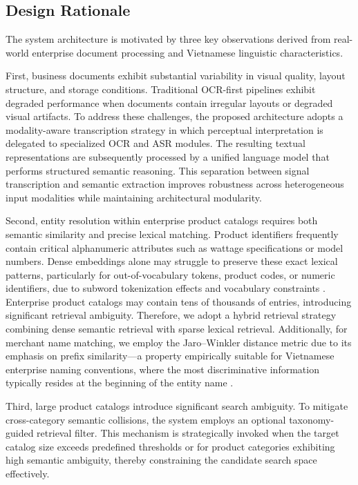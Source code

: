 \subsection{Design Rationale}
The system architecture is motivated by three key observations derived from real-world enterprise document processing and Vietnamese linguistic characteristics.

First, business documents exhibit substantial variability in visual quality, layout structure, and storage conditions. Traditional OCR-first pipelines exhibit degraded performance when documents contain irregular layouts or degraded visual artifacts. To address these challenges, the proposed architecture adopts a modality-aware transcription strategy in which perceptual interpretation is delegated to specialized OCR and ASR modules. The resulting textual representations are subsequently processed by a unified language model that performs structured semantic reasoning. This separation between signal transcription and semantic extraction improves robustness across heterogeneous input modalities while maintaining architectural modularity.

Second, entity resolution within enterprise product catalogs requires both semantic similarity and precise lexical matching. Product identifiers frequently contain critical alphanumeric attributes such as wattage specifications or model numbers. Dense embeddings alone may struggle to preserve these exact lexical patterns, particularly for out-of-vocabulary tokens, product codes, or numeric identifiers, due to subword tokenization effects and vocabulary constraints \parencite{thakur2021beir, lin2022pretrained}. Enterprise product catalogs may contain tens of thousands of entries, introducing significant retrieval ambiguity.
Therefore, we adopt a hybrid retrieval strategy combining dense semantic retrieval with sparse lexical retrieval. Additionally, for merchant name matching, we employ the Jaro–Winkler distance metric due to its emphasis on prefix similarity---a property empirically suitable for Vietnamese enterprise naming conventions, where the most discriminative information typically resides at the beginning of the entity name \parencite{nguyen2021phonlp}.

Third, large product catalogs introduce significant search ambiguity. To mitigate cross-category semantic collisions, the system employs an optional taxonomy-guided retrieval filter. This mechanism is strategically invoked when the target catalog size exceeds predefined thresholds or for product categories exhibiting high semantic ambiguity, thereby constraining the candidate search space effectively.

